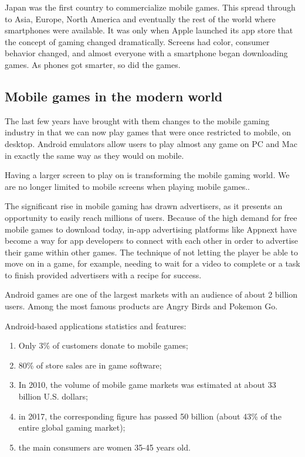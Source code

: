 \documentclass[sig-alternate]{article}
\begin{document}
\begin{multicols}{1}
Japan was the first country to commercialize mobile games. This spread through to Asia, Europe, North America and eventually the rest of the world where smartphones were available. It was only when Apple launched its app store that the concept of gaming changed dramatically. Screens had color, consumer behavior changed, and almost everyone with a smartphone began downloading games. As phones got smarter, so did the games.

\subsection{Mobile games in the modern world}
The last few years have brought with them changes to the mobile gaming industry in that we can now play games that were once restricted to mobile, on desktop. Android emulators allow users to play almost any game on PC and Mac in exactly the same way as they would on mobile.

Having a larger screen to play on is transforming the mobile gaming world. We are no longer limited to mobile screens when playing mobile games.\cite{Now}. 

The significant rise in mobile gaming has drawn advertisers, as it presents an opportunity to easily reach millions of users. Because of the high demand for free mobile games to download today, in-app advertising platforms like Appnext have become a way for app developers to connect with each other in order to advertise their game within other games. The technique of not letting the player be able to move on in a game, for example, needing to wait for a video to complete or a task to finish provided advertisers with a recipe for success.

Android games are one of the largest markets with an audience of about 2 billion users. Among the most famous products are Angry Birds and Pokemon Go.

Android-based applications statistics and features:
\begin{enumerate}
\item Only 3\% of customers donate to mobile games;
\item 80\% of store sales are in game software;
\item In 2010, the volume of mobile game markets was estimated at about 33 billion U.S. dollars;
\item in 2017, the corresponding figure has passed 50 billion (about 43\% of the entire global gaming market);
\item the main consumers are women 35-45 years old.
\end{enumerate}


\end{multicols}
\end{document}
